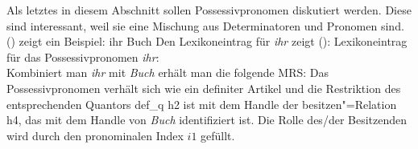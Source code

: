 Als letztes in diesem Abschnitt sollen Possessivpronomen diskutiert werden. Diese sind interessant,
weil sie eine Mischung aus Determinatoren und Pronomen sind. () zeigt ein Beispiel:
\ea
ihr Buch
\z
Den Lexikoneintrag für \emph{ihr} zeigt ():
\eas
\label{Lexikoneintrag Possessivpronomen}%
\label{le-Possessivpronomen}%
Lexikoneintrag für das Possessivpronomen \emph{ihr}:\\
\zs
Kombiniert man \emph{ihr} mit \emph{Buch} erhält man die folgende MRS:
\ea
\label{MRS ihr Buch}
\z
Das Possessivpronomen verhält sich wie ein definiter Artikel und die Restriktion des entsprechenden
Quantors def\_q h2 ist \qeq mit dem Handle der besitzen"=Relation h4, das mit dem Handle von
\emph{Buch} identifiziert ist. Die Rolle des/der Besitzenden wird durch den pronominalen Index $i1$ gefüllt.


